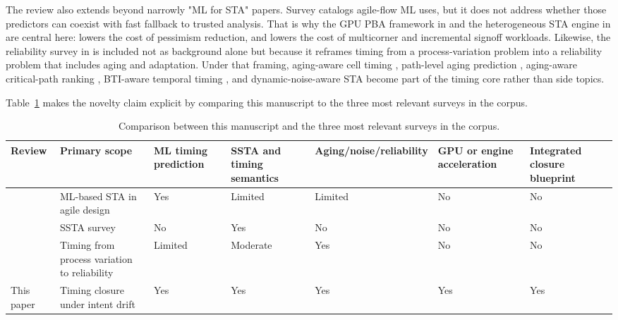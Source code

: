 \documentclass[num-refs]{wiley-article}
\begin{document}
    The review also extends beyond narrowly "ML for STA" papers. Survey \cite{ref20} catalogs agile-flow ML uses, but it does not address whether those predictors can coexist with fast fallback to trusted analysis. That is why the GPU PBA framework in \cite{ref21} and the heterogeneous STA engine in \cite{ref22} are central here: \cite{ref21} lowers the cost of pessimism reduction, and \cite{ref22} lowers the cost of multicorner and incremental signoff workloads. Likewise, the reliability survey in \cite{ref39} is included not as background alone but because it reframes timing from a process-variation problem into a reliability problem that includes aging and adaptation. Under that framing, aging-aware cell timing \cite{ref14}, path-level aging prediction \cite{ref15}, aging-aware critical-path ranking \cite{ref23}, BTI-aware temporal timing \cite{ref44}, and dynamic-noise-aware STA \cite{ref12} become part of the timing core rather than side topics.


    Table~\ref{tab:wiley-1} makes the novelty claim explicit by comparing this manuscript to the three most relevant surveys in the corpus.


    \begin{table}[tbp]
    \centering
    \caption{Comparison between this manuscript and the three most relevant surveys in the corpus.}
    \label{tab:wiley-1}
    \small
    \begin{tabularx}{\textwidth}{>{\raggedright\arraybackslash}X >{\raggedright\arraybackslash}X >{\raggedright\arraybackslash}X >{\raggedright\arraybackslash}X >{\raggedright\arraybackslash}X >{\raggedright\arraybackslash}X >{\raggedright\arraybackslash}X}
    \toprule
    \textbf{Review} & \textbf{Primary scope} & \textbf{ML timing prediction} & \textbf{SSTA and timing semantics} & \textbf{Aging/noise/reliability} & \textbf{GPU or engine acceleration} & \textbf{Integrated closure blueprint} \\
    \midrule
    \cite{ref20} & ML-based STA in agile design & Yes & Limited & Limited & No & No \\
    \cite{ref49} & SSTA survey & No & Yes & No & No & No \\
    \cite{ref39} & Timing from process variation to reliability & Limited & Moderate & Yes & No & No \\
    This paper & Timing closure under intent drift & Yes & Yes & Yes & Yes & Yes \\
    \bottomrule
    \end{tabularx}
    \end{table}
\end{document}
